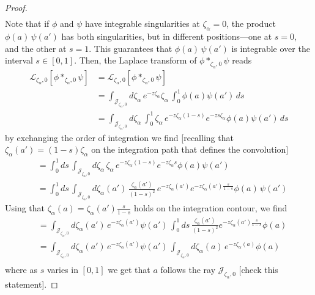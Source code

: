 \documentclass{article}
\newcommand{\laplace}{\mathcal{L}}
\theoremstyle{definition}
\theoremstyle{plain}
\newenvironment{todo}{\color{Coral}}{\color{black}}
\newenvironment{old}{\color{RoyalBlue}}{\color{black}}
\begin{document}
\begin{proof}
\begin{old}
\begin{align*}
\end{align*}    
Note that if $\phi$ and $\psi$ have integrable singularities at $\zeta_\alpha = 0$, the product $\phi(a)\,\psi(a')$ has both singularities, but in different positions---one at $s = 0$, and the other at $s = 1$. This guarantees that $\phi(a)\,\psi(a')$ is integrable over the interval $s \in [0, 1]$.
%   
Then, the Laplace transform of $\phi \ast_{\zeta_\alpha,0} \psi$ reads
\begin{align*}
\laplace_{\zeta_\alpha,0}[{\phi}\ast_{\zeta_\alpha,0}{\psi}]&=\laplace_{\zeta_\alpha,0}[{\phi}\ast_{\zeta_\alpha,0}{\psi}]\\
&=\int_{\mathcal{J}_{\zeta_\alpha,0}}d\zeta_\alpha\,e^{-z\zeta_\alpha}\zeta_\alpha\, \int_0^1 \phi(a) \psi(a')\,ds \\
&=\int_{\mathcal{J}_{\zeta_\alpha,0}}d\zeta_\alpha\, \int_0^1 \zeta_\alpha\,e^{-z\zeta_\alpha(1-s)} e^{-z s \zeta_\alpha} \phi(a) \psi(a')\,ds 
\end{align*}      
by exchanging the order of integration we find \begin{todo}[recalling that $\zeta_\alpha(a') = (1-s)\zeta_\alpha$ on the integration path that defines the convolution]\end{todo}
\begin{align*}
&=\int_0^1 ds\,\int_{\mathcal{J}_{\zeta_\alpha,0}}d\zeta_\alpha\,\zeta_\alpha\,e^{-z\zeta_\alpha(1-s)} e^{-z\zeta_\alpha s} \phi(a) \psi(a') \\
&=\int_0^1 ds\,\int_{\mathcal{J}_{\zeta_\alpha,0}}d\zeta_\alpha(a')\,\frac{\zeta_\alpha(a')}{(1-s)^2}\,e^{-z\zeta_\alpha(a')} e^{-z\zeta_\alpha(a') \frac{s}{1-s}} \phi(a)\,\psi(a') 
\end{align*}    
Using that $\zeta_\alpha(a)=\zeta_\alpha(a')\frac{s}{1-s}$ holds on the integration contour, we find
\begin{align*}
&=\int_{\mathcal{J}_{\zeta_\alpha,0}}d\zeta_\alpha(a') \,e^{-z\zeta_\alpha(a')}  \psi(a')\,\int_0^1 ds\,\frac{\zeta_\alpha(a')}{(1-s)^2}e^{-z\zeta_\alpha(a') \frac{s}{1-s}} \phi(a)\\
&=\int_{\mathcal{J}_{\zeta_\alpha,0}}d\zeta_\alpha(a') \,e^{-z\zeta_\alpha(a')}  \psi(a') \,\int_{\mathcal{J}_{\zeta_\alpha,0}} d\zeta_\alpha(a)\, e^{-z\zeta_\alpha(a)} \phi(a)\\
\end{align*} 
where as $s$ varies in $[0,1]$ we get that $a$ follows the ray $\mathcal{J}_{\zeta_\alpha,0}$ \begin{todo}[check this statement]\end{todo}.
\end{old}
\end{proof}
\end{document}
